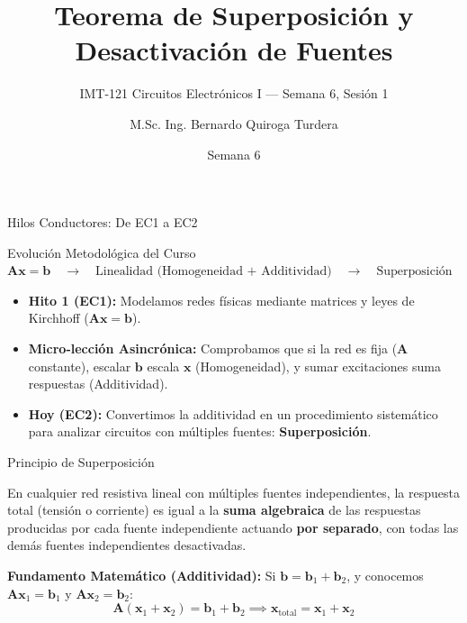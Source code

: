 \documentclass[aspectratio=169, table, xcdraw]{beamer}
\title[Superposición]{Teorema de Superposición y Desactivación de Fuentes}
\subtitle{IMT-121 Circuitos Electrónicos I — Semana 6, Sesión 1}
\author[B. Quiroga Turdera]{M.Sc. Ing. Bernardo Quiroga Turdera}
\institute[UCB Tarija]{Universidad Católica Boliviana ``San Pablo'' — Sede Tarija}
\date{Semana 6}
\begin{document}
\begin{frame}
    \titlepage
\end{frame}

\begin{frame}{Hilos Conductores: De EC1 a EC2}
    \begin{block}{Evolución Metodológica del Curso}
        \centering
        $\bm{A}\bm{x} = \bm{b} \quad \longrightarrow \quad \text{Linealidad (Homogeneidad + Additividad)} \quad \longrightarrow \quad \text{Superposición}$
    \end{block}
    
    \vspace{0.3cm}
    \begin{itemize}
        \item \textbf{Hito 1 (EC1):} Modelamos redes físicas mediante matrices y leyes de Kirchhoff ($\bm{A}\bm{x} = \bm{b}$).
        \item \textbf{Micro-lección Asincrónica:} Comprobamos que si la red es fija ($\bm{A}$ constante), escalar $\bm{b}$ escala $\bm{x}$ (Homogeneidad), y sumar excitaciones suma respuestas (Additividad).
        \item \textbf{Hoy (EC2):} Convertimos la additividad en un procedimiento sistemático para analizar circuitos con múltiples fuentes: \textbf{Superposición}.
    \end{itemize}
\end{frame}

\begin{frame}{Principio de Superposición}
    \begin{tcolorbox}[colback=ucbblue!5, colframe=ucbblue, title=Definición del Teorema]
        En cualquier red resistiva lineal con múltiples fuentes independientes, la respuesta total (tensión o corriente) es igual a la \textbf{suma algebraica} de las respuestas producidas por cada fuente independiente actuando \textbf{por separado}, con todas las demás fuentes independientes desactivadas.
    \end{tcolorbox}
    
    \vspace{0.2cm}
    \textbf{Fundamento Matemático (Additividad):}
    Si $\bm{b} = \bm{b}_1 + \bm{b}_2$, y conocemos $\bm{A}\bm{x}_1 = \bm{b}_1$ y $\bm{A}\bm{x}_2 = \bm{b}_2$:
    \begin{equation*}
        \bm{A}(\bm{x}_1 + \bm{x}_2) = \bm{b}_1 + \bm{b}_2 \implies \bm{x}_{\text{total}} = \bm{x}_1 + \bm{x}_2
    \end{equation*}
\end{frame}
\end{document}
